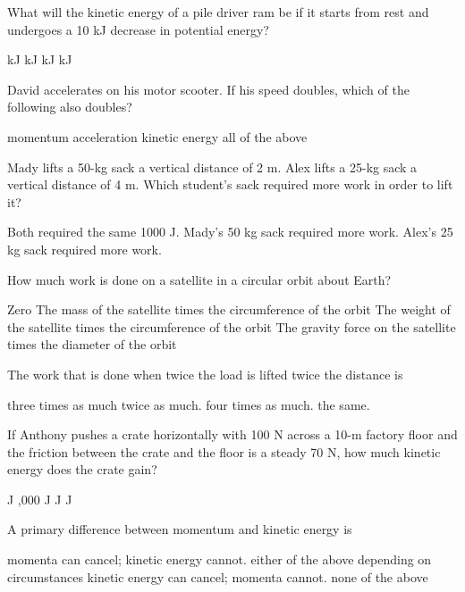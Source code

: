 \documentclass{exam}
\begin{document}
\begin{questions}
\question  What will the kinetic energy of a pile driver ram be if it starts from rest and undergoes a 10 kJ decrease in potential energy? 
\begin{choices}
   kJ 
   kJ 
   kJ 
   kJ 
\end{choices}
\vfill{}

\newpage{}

\question David accelerates on his motor scooter. If his speed doubles, which of the following also doubles?
\begin{choices}
  \choice momentum
  \choice acceleration
  \choice kinetic energy
  \choice all of the above
\end{choices}
\vfill{}

\question Mady lifts a 50-kg sack a vertical distance of 2 m. Alex lifts a 25-kg sack a vertical distance of 4 m. Which student's sack required more work in order to lift it?
\begin{choices}
  \choice Both required the same 1000 J. 
  \choice Mady's 50 kg sack required more work. 
  \choice Alex's 25 kg sack required more work. 
\end{choices}
\vfill{}

\question How much work is done on a satellite in a circular orbit about Earth?  
\begin{choices}
  \choice Zero 
  \choice The mass of the satellite times the circumference of the orbit 
  \choice The weight of the satellite times the circumference of the orbit 
  \choice The gravity force on the satellite times the diameter of the orbit 
\end{choices}
\vfill{}

\question The work that is done when twice the load is lifted twice the distance is 
\begin{choices}
  \choice three times as much 
  \choice twice as much. 
  \choice four times as much. 
  \choice the same. 
\end{choices}
\vfill{}

\question  If Anthony pushes a crate horizontally with 100 N across a 10-m factory floor and the friction between the crate and the floor is a steady 70 N, how much kinetic energy does the crate gain? 
\begin{choices}
   J 
  ,000 J 
   J 
   J 
\end{choices}
\vfill{}

\question A primary difference between momentum and kinetic energy is  
\begin{choices}
  \choice momenta can cancel; kinetic energy cannot.
  \choice either of the above depending on circumstances
  \choice kinetic energy can cancel; momenta cannot.
  \choice none of the above
\end{choices}
\vfill{}


\end{questions}
\end{document}
